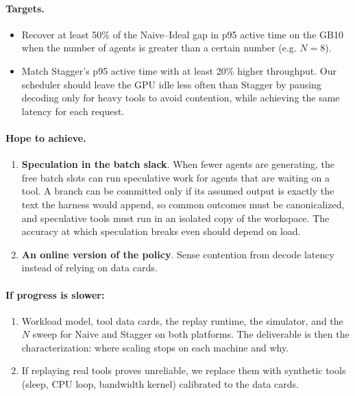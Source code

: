 \documentclass[11pt]{article}
\begin{document}
\paragraph{Targets.}
\begin{itemize}
  \item Recover at least 50\% of the Naive--Ideal gap in p95 active time on the GB10 when the number of agents is greater than a certain number (e.g. $N=8$).
  \item Match Stagger's p95 active time with at least 20\% higher throughput.
    Our scheduler should leave the GPU idle less often than Stagger by
    pausing decoding only for heavy tools to avoid contention, while
    achieving the same latency for each request.
\end{itemize}


\paragraph{Hope to achieve.}
\begin{enumerate}
  \item \textbf{Speculation in the batch slack}. When fewer agents are
    generating, the free batch slots can run speculative work for agents that
    are waiting on a tool. A branch can be committed only if its assumed
    output is exactly the text the harness would append, so common outcomes
    must be canonicalized, and speculative tools must run in an isolated copy
    of the workspace. The accuracy at which speculation breaks even should depend on load.
  \item \textbf{An online version of the policy}. Sense contention from decode
    latency instead of relying on data cards.
\end{enumerate}
 
\paragraph{If progress is slower:}
\begin{enumerate}
  \item Workload model, tool data cards, the replay runtime, the simulator, and the
    $N$ sweep for Naive and Stagger on both platforms. The deliverable is then the
    characterization: where scaling stops on each machine and why.
  \item If replaying real tools proves unreliable, we replace them with synthetic tools (sleep, CPU
    loop, bandwidth kernel) calibrated to the data cards.
\end{enumerate}
 
\end{document}
